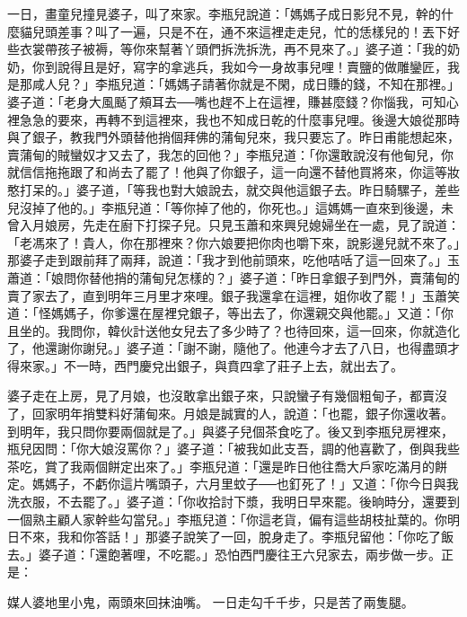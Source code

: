 一日，畫童兒撞見婆子，叫了來家。李瓶兒說道：「媽媽子成日影兒不見，幹的什麼貓兒頭差事？叫了一遍，只是不在，通不來這裡走走兒，忙的恁樣兒的！丟下好些衣裳帶孩子被褥，等你來幫著丫頭們拆洗拆洗，再不見來了。」婆子道：「我的奶奶，你到說得且是好，寫字的拿逃兵，我如今一身故事兒哩！賣鹽的做雕鑾匠，我是那咸人兒？」李瓶兒道：「媽媽子請著你就是不閑，成日賺的錢，不知在那裡。」婆子道：「老身大風颳了頰耳去──嘴也趕不上在這裡，賺甚麼錢？你惱我，可知心裡急急的要來，再轉不到這裡來，我也不知成日乾的什麼事兒哩。後邊大娘從那時與了銀子，教我門外頭替他捎個拜佛的蒲甸兒來，我只要忘了。昨日甫能想起來，賣蒲甸的賊蠻奴才又去了，我怎的回他？」李瓶兒道：「你還敢說沒有他甸兒，你就信信拖拖跟了和尚去了罷了！他與了你銀子，這一向還不替他買將來，你這等妝憨打呆的。」婆子道，「等我也對大娘說去，就交與他這銀子去。昨日騎騾子，差些兒沒掉了他的。」李瓶兒道：「等你掉了他的，你死也。」這媽媽一直來到後邊，未曾入月娘房，先走在廚下打探子兒。只見玉蕭和來興兒媳婦坐在一處，見了說道：「老馮來了！貴人，你在那裡來？你六娘要把你肉也嚼下來，說影邊兒就不來了。」那婆子走到跟前拜了兩拜，說道：「我才到他前頭來，吃他咭咶了這一回來了。」玉蕭道：「娘問你替他捎的蒲甸兒怎樣的？」婆子道：「昨日拿銀子到門外，賣蒲甸的賣了家去了，直到明年三月里才來哩。銀子我還拿在這裡，姐你收了罷！」玉蕭笑道：「怪媽媽子，你爹還在屋裡兌銀子，等出去了，你還親交與他罷。」又道：「你且坐的。我問你，韓伙計送他女兒去了多少時了？也待回來，這一回來，你就造化了，他還謝你謝兒。」婆子道：「謝不謝，隨他了。他連今才去了八日，也得盡頭才得來家。」不一時，西門慶兌出銀子，與賁四拿了莊子上去，就出去了。

婆子走在上房，見了月娘，也沒敢拿出銀子來，只說蠻子有幾個粗甸子，都賣沒了，回家明年捎雙料好蒲甸來。月娘是誠實的人，說道：「也罷，銀子你還收著。到明年，我只問你要兩個就是了。」與婆子兒個茶食吃了。後又到李瓶兒房裡來，瓶兒因問：「你大娘沒罵你？」婆子道：「被我如此支吾，調的他喜歡了，倒與我些茶吃，賞了我兩個餅定出來了。」李瓶兒道：「還是昨日他往喬大戶家吃滿月的餅定。媽媽子，不虧你這片嘴頭子，六月里蚊子──也釘死了！」又道：「你今日與我洗衣服，不去罷了。」婆子道：「你收拾討下漿，我明日早來罷。後晌時分，還要到一個熟主顧人家幹些勾當兒。」李瓶兒道：「你這老貨，偏有這些胡枝扯葉的。你明日不來，我和你答話！」那婆子說笑了一回，脫身走了。李瓶兒留他：「你吃了飯去。」婆子道：「還飽著哩，不吃罷。」恐怕西門慶往王六兒家去，兩步做一步。正是：

媒人婆地里小鬼，兩頭來回抹油嘴。
一日走勾千千步，只是苦了兩隻腿。


